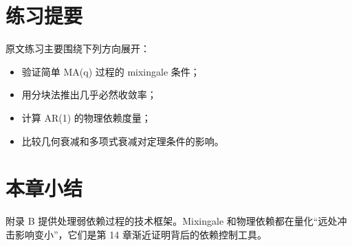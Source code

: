 \documentclass[11pt,a4paper]{ctexart}
\begin{document}
\section{练习提要}

原文练习主要围绕下列方向展开：
\begin{itemize}
  \item 验证简单 MA(q) 过程的 mixingale 条件；
  \item 用分块法推出几乎必然收敛率；
  \item 计算 AR(1) 的物理依赖度量；
  \item 比较几何衰减和多项式衰减对定理条件的影响。
\end{itemize}

\section*{本章小结}

附录 B 提供处理弱依赖过程的技术框架。Mixingale 和物理依赖都在量化“远处冲击影响变小”，它们是第 14 章渐近证明背后的依赖控制工具。
\end{document}
